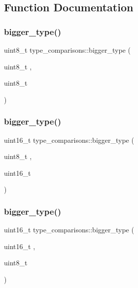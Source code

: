 \subsection{Function Documentation}
\hypertarget{namespacetype__comparisons_a864255d8954d6a50a5ca3881b6ac8525}{}\label{namespacetype__comparisons_a864255d8954d6a50a5ca3881b6ac8525} 
\subsubsection{\texorpdfstring{bigger\+\_\+type()}{bigger\_type()}\hspace{0.1cm}{\footnotesize\ttfamily [1/12]}}
{\footnotesize\ttfamily uint8\+\_\+t type\+\_\+comparisons\+::bigger\+\_\+type (\begin{DoxyParamCaption}\item[{uint8\+\_\+t}]{,  }\item[{uint8\+\_\+t}]{ }\end{DoxyParamCaption})}

\hypertarget{namespacetype__comparisons_a4abbfdbb21f2c59853a4d979138e43ec}{}\label{namespacetype__comparisons_a4abbfdbb21f2c59853a4d979138e43ec} 
\subsubsection{\texorpdfstring{bigger\+\_\+type()}{bigger\_type()}\hspace{0.1cm}{\footnotesize\ttfamily [2/12]}}
{\footnotesize\ttfamily uint16\+\_\+t type\+\_\+comparisons\+::bigger\+\_\+type (\begin{DoxyParamCaption}\item[{uint8\+\_\+t}]{,  }\item[{uint16\+\_\+t}]{ }\end{DoxyParamCaption})}

\hypertarget{namespacetype__comparisons_abd3e8fa263291a3599efd53b16e97dfd}{}\label{namespacetype__comparisons_abd3e8fa263291a3599efd53b16e97dfd} 
\subsubsection{\texorpdfstring{bigger\+\_\+type()}{bigger\_type()}\hspace{0.1cm}{\footnotesize\ttfamily [3/12]}}
{\footnotesize\ttfamily uint16\+\_\+t type\+\_\+comparisons\+::bigger\+\_\+type (\begin{DoxyParamCaption}\item[{uint16\+\_\+t}]{,  }\item[{uint8\+\_\+t}]{ }\end{DoxyParamCaption})}

